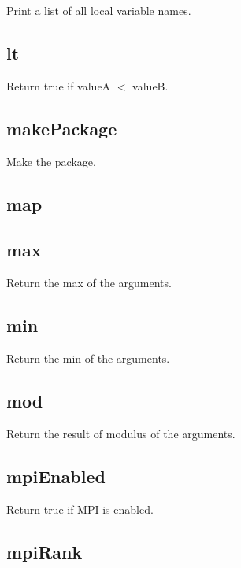 \begin{itemize}
  Print a list of all local variable names.

\subsection{lt}
  \par

  Return true if valueA $<$ valueB.

\subsection{makePackage}

  Make the package.

\subsection{map}
\subsection{max}
  \par

  Return the max of the arguments.

\subsection{min}
  \par

  Return the min of the arguments.

\subsection{mod}
  \par

  Return the result of modulus of the arguments.

\subsection{mpiEnabled}

  Return true if MPI is enabled.

\subsection{mpiRank}


\end{itemize}

